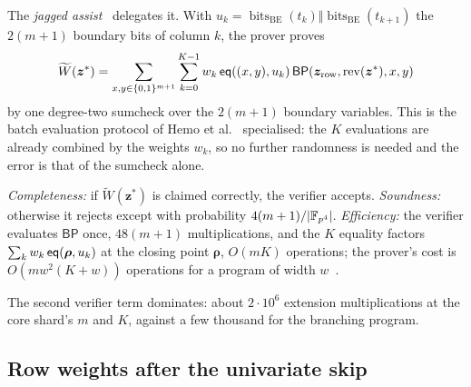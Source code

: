 The \emph{jagged assist}~\citep[Thm.~1.5]{jagged-pcs} delegates it. With $u_k=\operatorname{bits}_{\mathrm{BE}}(t_k)\Vert\operatorname{bits}_{\mathrm{BE}}(t_{k+1})$ the $2(m+1)$ boundary bits of column $k$, the prover proves
\begin{equation}
\label{eq:jagged-assist}
  \widetilde W(\bm z^*)
  =\sum_{x,y\in\{0,1\}^{m+1}}
    \sum_{k=0}^{K-1}
      w_k\,
      \mathsf{eq}((x,y),u_k)\,
      \mathsf{BP}(\bm z_{\mathrm{row}},\operatorname{rev}(\bm z^*),x,y)
\end{equation}
by one degree-two sumcheck over the $2(m+1)$ boundary variables. This is the batch evaluation protocol of Hemo et al.~\citep[Lemma~5.1]{jagged-pcs} specialised: the $K$ evaluations are already combined by the weights $w_k$, so no further randomness is needed and the error is that of the sumcheck alone.

\begin{theorem}
\label{thm:jagged-assist}
\emph{Completeness:} if $\widetilde W(\bm z^*)$ is claimed correctly, the verifier accepts.
\emph{Soundness:} otherwise it rejects except with probability $4(m+1)/|\mathbb{F}_{p^4}|$.
\emph{Efficiency:} the verifier evaluates $\mathsf{BP}$ once, $48(m+1)$ multiplications, and the $K$ equality factors $\sum_k w_k\,\mathsf{eq}(\bm\rho, u_k)$ at the closing point $\bm\rho$, $O(mK)$ operations; the prover's cost is $O(m w^2 (K + w))$ operations for a program of width $w$~\citep[Lemma~4.6]{jagged-pcs}.
\end{theorem}

The second verifier term dominates: about $2 \cdot 10^6$ extension multiplications at the core shard's $m$ and $K$, against a few thousand for the branching program.

\subsection{Row weights after the univariate skip}
\label{sec:pcs-skip}

